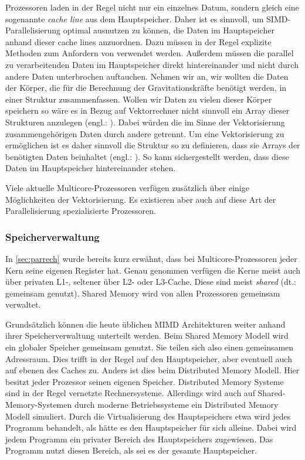       Prozessoren laden in der Regel nicht nur ein einzelnes Datum, sondern gleich eine sogenannte \textit{cache line} aus dem Hauptspeicher. Daher ist es sinnvoll, 
      um SIMD-Parallelisierung optimal ausnutzen zu können, die Daten im Hauptspeicher anhand dieser cache lines anzuordnen. Dazu müssen in der Regel explizite Methoden zum Anfordern von 
       verwendet werden. Außerdem müssen die parallel zu verarbeitenden Daten im Hauptspeicher direkt hintereinander und nicht durch andere Daten 
      unterbrochen auftauchen. Nehmen wir an, wir wollten die Daten der Körper, die für die Berechnung der Gravitationskräfte benötigt werden, in einer Struktur zusammenfassen. Wollen wir
      Daten zu vielen dieser Körper speichern so wäre es in Bezug auf Vektorrechner nicht sinnvoll ein Array dieser Strukturen anzulegen (engl.: ).
      Dabei würden die im Sinne der Vektorisierung zusammengehörigen Daten durch andere getrennt. Um eine Vektorisierung zu ermöglichen ist es daher sinnvoll die Struktur so zu definieren,
      dass sie Arrays der benötigten Daten beinhaltet (engl.: ). So kann sichergestellt werden, dass diese Daten im Hauptspeicher hintereinander stehen.
      \citep{hpcskript, architect}
      
      Viele aktuelle Multicore-Prozessoren verfügen zusätzlich über einige Möglichkeiten der Vektorisierung. Es existieren aber auch auf diese Art der Parallelisierung spezialisierte Prozessoren.
      \citep{architect}
      
      \subsubsection{Speicherverwaltung}
      \label{sec:speicher}
	In \autoref{sec:parrech} wurde bereits kurz erwähnt, dass bei Multicore-Prozessoren jeder Kern seine eigenen Register hat. Genau genommen verfügen die Kerne meist auch über privaten L1-,
	seltener über L2- oder L3-Cache. Diese sind meist \textit{shared} (dt.: gemeinsam genutzt). Shared Memory wird von allen Prozessoren gemeinsam verwaltet.
	
	Grundsätzlich können die heute üblichen MIMD Architekturen weiter anhand ihrer Speicherverwaltung unterteilt werden. Beim Shared Memory Modell wird ein globaler
	Speicher gemeinsam genutzt. Sie teilen sich also einen gemeinsamen Adressraum. Dies trifft in der Regel auf den Hauptspeicher, aber eventuell auch auf ebenen des Caches zu.
	Anders ist dies beim Distributed Memory Modell. Hier besitzt jeder Prozessor seinen eigenen Speicher. Distributed Memory Systeme sind in der Regel vernetzte Rechnersysteme. Allerdings wird
	auch auf Shared-Memory-Systemen durch moderne Betriebssysteme ein Distributed Memory Modell simuliert. Durch die Virtualisierung des Hauptspeichers etwa wird jedes Programm behandelt,
	als hätte es den Hauptspeicher für sich alleine. Dabei wird jedem Programm ein privater Bereich des Hauptspeichers zugewiesen. Das Programm nutzt diesen Bereich, als sei es der gesamte
	Hauptspeicher. \citep{korbler}
	

